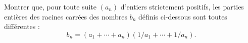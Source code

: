 Montrer que, pour toute suite $(a_n)$ d'entiers strictement positifs, les parties entières des racines carrées des nombres $b_n$ définis ci-dessous sont toutes différentes :
\[ b_n = (a_1 + \cdots + a_n)(1/a_1 + \cdots + 1/a_n). \]
